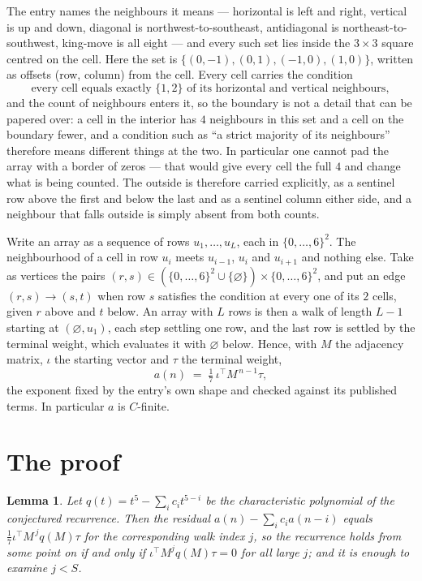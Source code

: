 \documentclass[11pt,a4paper]{article}
\theoremstyle{plain}
\newtheorem{lemma}[theorem]{Lemma}
\theoremstyle{definition}
\begin{document}
The entry names the neighbours it means --- horizontal is left and right, vertical is up and
down, diagonal is northwest-to-southeast, antidiagonal is northeast-to-southwest, king-move is
all eight --- and every such set lies inside the $3\times3$ square centred on the cell. Here
the set is $\{(0,-1), (0,1), (-1,0), (1,0)\}$, written as offsets (row, column) from the cell. Every cell carries
the condition
\[
\text{every cell equals exactly }\{1,2\}\text{ of its horizontal and vertical neighbours},
\]
and the count of neighbours enters it, so the boundary is not a detail that can be papered
over: a cell in the interior has $4$ neighbours in this set and a cell on the boundary
fewer, and a condition such as ``a strict majority of its neighbours'' therefore means
different things at the two. In particular one cannot pad the array with a border of zeros ---
that would give every cell the full $4$ and change what is being counted. The outside is
therefore carried
explicitly, as a sentinel row above the first and below the last and as a sentinel column
either side, and a neighbour that falls outside is simply absent from both counts.

Write an array as a sequence of rows $u_1,\dots,u_L$, each in
$\{0,\dots,6\}^{2}$. The neighbourhood of a cell in row $u_i$ meets $u_{i-1}$,
$u_i$ and $u_{i+1}$ and nothing else. Take as vertices the pairs
$(r,s)\in(\{0,\dots,6\}^{2}\cup\{\varnothing\})\times\{0,\dots,6\}^{2}$,
and put an edge $(r,s)\to(s,t)$ when row $s$ satisfies the condition at every one of its
$2$ cells, given $r$ above and $t$ below. An array with $L$ rows is then a walk of length
$L-1$ starting at $(\varnothing,u_1)$, each step settling one row, and the last row is
settled by the terminal weight, which evaluates it with $\varnothing$ below. Hence,
with $M$ the adjacency matrix, $\iota$ the starting vector and $\tau$ the terminal weight,
\[
a(n)\;=\;\tfrac1{7}\,\iota^{\!\top}M^{\,n-1}\tau ,
\]
the exponent fixed by the entry's own shape and checked against its published terms. In
particular $a$ is $C$-finite.

\section{The proof}

\begin{lemma}\label{lem:crit}
Let $q(t)=t^{5}-\sum_i c_it^{5-i}$ be the characteristic polynomial of the
conjectured recurrence. Then the residual $a(n)-\sum_ic_ia(n-i)$ equals
$\tfrac1{7}\iota^{\!\top}M^{\,j}q(M)\tau$ for the corresponding walk index $j$, so the
recurrence holds from some point on if and only if $\iota^{\!\top}M^{j}q(M)\tau=0$ for all
large $j$; and it is enough to examine $j<S$.
\end{lemma}
\end{document}
